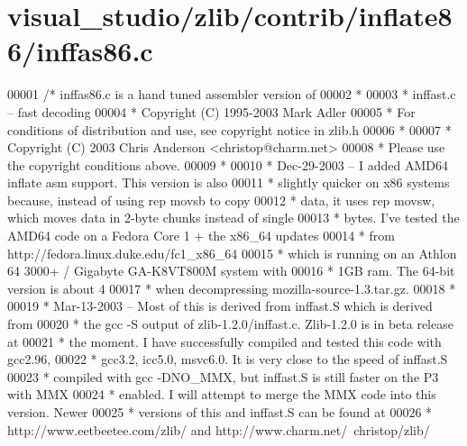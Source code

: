 \hypertarget{visual__studio_2zlib_2contrib_2inflate86_2inffas86_8c_source}{}\section{visual\+\_\+studio/zlib/contrib/inflate86/inffas86.c}
\label{visual__studio_2zlib_2contrib_2inflate86_2inffas86_8c_source}

\begin{DoxyCode}
00001 \textcolor{comment}{/* inffas86.c is a hand tuned assembler version of}
00002 \textcolor{comment}{ *}
00003 \textcolor{comment}{ * inffast.c -- fast decoding}
00004 \textcolor{comment}{ * Copyright (C) 1995-2003 Mark Adler}
00005 \textcolor{comment}{ * For conditions of distribution and use, see copyright notice in zlib.h}
00006 \textcolor{comment}{ *}
00007 \textcolor{comment}{ * Copyright (C) 2003 Chris Anderson <christop@charm.net>}
00008 \textcolor{comment}{ * Please use the copyright conditions above.}
00009 \textcolor{comment}{ *}
00010 \textcolor{comment}{ * Dec-29-2003 -- I added AMD64 inflate asm support.  This version is also}
00011 \textcolor{comment}{ * slightly quicker on x86 systems because, instead of using rep movsb to copy}
00012 \textcolor{comment}{ * data, it uses rep movsw, which moves data in 2-byte chunks instead of single}
00013 \textcolor{comment}{ * bytes.  I've tested the AMD64 code on a Fedora Core 1 + the x86\_64 updates}
00014 \textcolor{comment}{ * from http://fedora.linux.duke.edu/fc1\_x86\_64}
00015 \textcolor{comment}{ * which is running on an Athlon 64 3000+ / Gigabyte GA-K8VT800M system with}
00016 \textcolor{comment}{ * 1GB ram.  The 64-bit version is about 4%
00017 \textcolor{comment}{ * when decompressing mozilla-source-1.3.tar.gz.}
00018 \textcolor{comment}{ *}
00019 \textcolor{comment}{ * Mar-13-2003 -- Most of this is derived from inffast.S which is derived from}
00020 \textcolor{comment}{ * the gcc -S output of zlib-1.2.0/inffast.c.  Zlib-1.2.0 is in beta release at}
00021 \textcolor{comment}{ * the moment.  I have successfully compiled and tested this code with gcc2.96,}
00022 \textcolor{comment}{ * gcc3.2, icc5.0, msvc6.0.  It is very close to the speed of inffast.S}
00023 \textcolor{comment}{ * compiled with gcc -DNO\_MMX, but inffast.S is still faster on the P3 with MMX}
00024 \textcolor{comment}{ * enabled.  I will attempt to merge the MMX code into this version.  Newer}
00025 \textcolor{comment}{ * versions of this and inffast.S can be found at}
00026 \textcolor{comment}{ * http://www.eetbeetee.com/zlib/ and http://www.charm.net/~christop/zlib/}
}
\end{DoxyCode}
